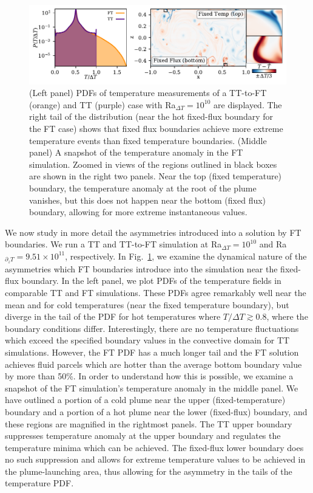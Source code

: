 \documentclass[aps, pre, onecolumn, nofootinbib, notitlepage, groupedaddress, amsfonts, amssymb, amsmath, longbibliography, superscriptaddress]{revtex4-1}
\begin{document}
\begin{figure}
\includegraphics[width=\textwidth]{./figs/rbc_dynamics_asymmetries.pdf}
\caption{ 
	(Left panel) PDFs of temperature measurements of a TT-to-FT (orange) and TT (purple) case with Ra$_{\Delta T} = 10^{10}$ are displayed.
	The right tail of the distribution (near the hot fixed-flux boundary for the FT case) shows that fixed flux boundaries achieve more extreme temperature events than fixed temperature boundaries.
	(Middle panel) A snapshot of the temperature anomaly in the FT simulation.
	Zoomed in views of the regions outlined in black boxes are shown in the right two panels.
	Near the top (fixed temperature) boundary, the temperature anomaly at the root of the plume vanishes, but this does not happen near the bottom (fixed flux) boundary, allowing for more extreme instantaneous values.
\label{fig:rbc_dynamics_asymmetries} }
\end{figure}

We now study in more detail the asymmetries introduced into a solution by FT boundaries.
We run a TT and TT-to-FT simulation at Ra$_{\Delta T} = 10^{10}$ and Ra$_{\partial_z T} = 9.51 \times 10^{11}$, respectively.
In Fig.~\ref{fig:rbc_dynamics_asymmetries}, we examine the dynamical nature of the asymmetries which FT boundaries introduce into the simulation near the fixed-flux boundary.
In the left panel, we plot PDFs of the temperature fields in comparable TT and FT simulations.
These PDFs agree remarkably well near the mean and for cold temperatures (near the fixed temperature boundary), but diverge in the tail of the PDF for hot temperatures where $T/\Delta T \gtrsim 0.8$, where the boundary conditions differ.
Interestingly, there are no temperature fluctuations which exceed the specified boundary values in the convective domain for TT simulations.
However, the FT PDF has a much longer tail and the FT solution achieves fluid parcels which are hotter than the average bottom boundary value by more than 50\%.
In order to understand how this is possible, we examine a snapshot of the FT simulation's temperature anomaly in the middle panel.
We have outlined a portion of a cold plume near the upper (fixed-temperature) boundary and a portion of a hot plume near the lower (fixed-flux) boundary, and these regions are magnified in the rightmost panels.
The TT upper boundary suppresses temperature anomaly at the upper boundary and regulates the temperature minima which can be achieved.
The fixed-flux lower boundary does no such suppression and allows for extreme temperature values to be achieved in the plume-launching area, thus allowing for the asymmetry in the tails of the temperature PDF.
\end{document}
